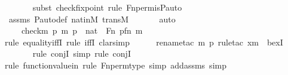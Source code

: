 \begin{isabellebody}
\ \ \ \ \ \ \isamarkupfalse%
{\isacharparenleft}{\kern0pt}subst\ check{\isacharunderscore}{\kern0pt}fixpoint{\isacharcomma}{\kern0pt}\ rule\ Fn{\isacharunderscore}{\kern0pt}perm{\isacharprime}{\kern0pt}{\isacharunderscore}{\kern0pt}is{\isacharunderscore}{\kern0pt}P{\isacharunderscore}{\kern0pt}auto{\isacharparenright}{\kern0pt}\isanewline
\ \ \ \ \isamarkupfalse%
\ assms\ P{\isacharunderscore}{\kern0pt}auto{\isacharunderscore}{\kern0pt}def\ nat{\isacharunderscore}{\kern0pt}in{\isacharunderscore}{\kern0pt}M\ transM\ \isanewline
\ \ \ \ \isamarkupfalse%
\ auto\ \isanewline
\ \ \isamarkupfalse%
\ \isamarkupfalse%
\ {\isachardoublequoteopen}{\isachardot}{\kern0pt}{\isachardot}{\kern0pt}{\isachardot}{\kern0pt}\ {\isacharequal}{\kern0pt}\ {\isacharbraceleft}{\kern0pt}\ {\isacharless}{\kern0pt}check{\isacharparenleft}{\kern0pt}m{\isacharparenright}{\kern0pt}{\isacharcomma}{\kern0pt}\ p{\isachargreater}{\kern0pt}{\isachardot}{\kern0pt}{\isachardot}{\kern0pt}\ {\isacharless}{\kern0pt}m{\isacharcomma}{\kern0pt}\ p{\isachargreater}{\kern0pt}\ {\isasymin}\ nat\ {\isasymtimes}\ Fn{\isacharcomma}{\kern0pt}\ p{\isacharbackquote}{\kern0pt}{\isacharless}{\kern0pt}f{\isacharbackquote}{\kern0pt}n{\isacharcomma}{\kern0pt}\ m{\isachargreater}{\kern0pt}\ {\isacharequal}{\kern0pt}\ {}\ {\isacharbraceright}{\kern0pt}{\isachardoublequoteclose}\ \isanewline
\ \ \ \ \isamarkupfalse%
{\isacharparenleft}{\kern0pt}rule\ equality{\isacharunderscore}{\kern0pt}iffI{\isacharcomma}{\kern0pt}\ rule\ iffI{\isacharcomma}{\kern0pt}\ clarsimp{\isacharparenright}{\kern0pt}\isanewline
\ \ \ \ \ \isamarkupfalse%
{\isacharparenleft}{\kern0pt}rename{\isacharunderscore}{\kern0pt}tac\ m\ p{\isacharcomma}{\kern0pt}\ rule{\isacharunderscore}{\kern0pt}tac\ x{\isacharequal}{\kern0pt}m\ \ bexI{\isacharparenright}{\kern0pt}\isanewline
\ \ \ \ \ \ \isamarkupfalse%
{\isacharparenleft}{\kern0pt}rule\ conjI{\isacharcomma}{\kern0pt}\ simp{\isacharcomma}{\kern0pt}\ rule\ conjI{\isacharparenright}{\kern0pt}\isanewline
\ \ \ \ \ \ \ \isamarkupfalse%
{\isacharparenleft}{\kern0pt}rule\ function{\isacharunderscore}{\kern0pt}value{\isacharunderscore}{\kern0pt}in{\isacharcomma}{\kern0pt}\ rule\ Fn{\isacharunderscore}{\kern0pt}perm{\isacharprime}{\kern0pt}{\isacharunderscore}{\kern0pt}type{\isacharcomma}{\kern0pt}\ simp\ add{\isacharcolon}{\kern0pt}assms{\isacharcomma}{\kern0pt}\ simp{\isacharparenright}{\kern0pt}\isanewline
\ \ \ \ \ \ \isamarkupfalse%

\end{isabellebody}
